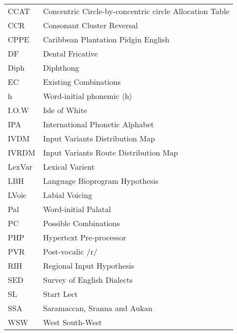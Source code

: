 \noindent\begin{tabular}{@{}lp{9.5cm}@{}} 
CCAT        &    Concentric Circle-by-concentric circle Allocation Table \\
CCR        &    Consonant Cluster Reversal \\
CPPE       &    {Caribbean} Plantation Pidgin {English} \\
DF       &    Dental Fricative \\
Diph        &    Diphthong \\
EC        &    Existing Combinations \\
h       &    Word-initial phonemic $\langle$h$\rangle$ \\
I.O.W        &    Isle of White \\

IPA        &    International Phonetic Alphabet\\
IVDM        &    Input {Variants} Distribution Map \\
IVRDM       &    Input {Variants} Route Distribution Map \\
LexVar       &    Lexical Varient \\
LBH        &    Language Bioprogram Hypothesis \\
LVoic       &    Labial Voicing \\
Pal       &    Word-initial Palatal \\
PC        &    Possible Combinations \\        
PHP        &    Hypertext Pre-processor \\
PVR       &    Post-vocalic /r/\\
RIH       &    Regional Input Hypothesis \\
SED        &    Survey of {English} {Dialects} \\
SL        &    Start Lect \\
SSA       &    {Saramaccan}, Sranna and {Aukan} \\
WSW        &    West South-West
\end{tabular}
